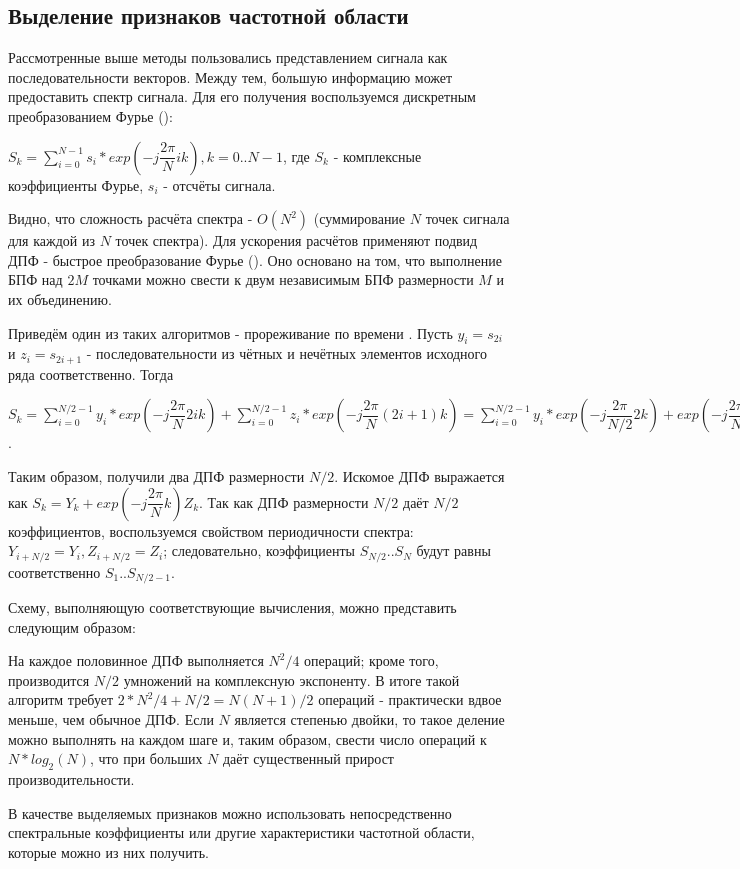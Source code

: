 \subsection{Выделение признаков частотной области}

Рассмотренные выше методы пользовались представлением сигнала как последовательности векторов. Между тем, большую информацию может предоставить спектр сигнала. Для его получения воспользуемся дискретным преобразованием Фурье ():

$S_k=\sum_{i=0}^{N-1}s_i*exp(-j\dfrac{2\pi}{N}ik), k=0..N-1$, где $S_k$ - комплексные коэффициенты Фурье, $s_i$ - отсчёты сигнала.


Видно, что сложность расчёта спектра - $O(N^2)$ (суммирование $N$ точек сигнала для каждой из $N$ точек спектра). Для ускорения расчётов применяют подвид ДПФ - быстрое преобразование Фурье (). Оно основано на том, что выполнение БПФ над $2M$ точками можно свести к двум независимым БПФ размерности $M$ и их объединению. 

Приведём один из таких алгоритмов - прореживание по времени \cite{fft_alg}. Пусть $y_i=s_{2i}$ и $z_i=s_{2i+1}$ - последовательности из чётных и нечётных элементов исходного ряда соответственно. Тогда

$S_k=\sum_{i=0}^{N/2-1}y_i*exp(-j\dfrac{2\pi}{N}2ik)+\sum_{i=0}^{N/2-1}z_i*exp(-j\dfrac{2\pi}{N}(2i+1)k)=\sum_{i=0}^{N/2-1}y_i*exp(-j\dfrac{2\pi}{N/2}2k)+exp(-j\dfrac{2\pi}{N}k)\sum_{i=0}^{N/2-1}z_i*exp(-j\dfrac{2\pi}{N/2}ik)$.

Таким образом, получили два ДПФ размерности $N/2$. Искомое ДПФ выражается как 
$S_k=Y_k+exp(-j\dfrac{2\pi}{N}k)Z_k$. Так как ДПФ размерности $N/2$ даёт $N/2$ коэффициентов, воспользуемся свойством периодичности спектра: $Y_{i+N/2}=Y_i, Z_{i+N/2}=Z_i$; следовательно, коэффициенты $S_{N/2}..S_{N}$ будут равны соответственно $S_{1}..S_{N/2-1}$. 

Схему, выполняющую соответствующие вычисления, можно представить следующим образом:


На каждое половинное ДПФ выполняется $N^2/4$ операций; кроме того, производится $N/2$ умножений на комплексную экспоненту. В итоге такой алгоритм требует $2*N^2/4+N/2=N(N+1)/2$ операций - практически вдвое меньше, чем обычное ДПФ. Если $N$ является степенью двойки, то такое деление можно выполнять на каждом шаге и, таким образом, свести число операций к $N*log_2(N)$, что при больших $N$ даёт существенный прирост производительности.

В качестве выделяемых признаков можно использовать непосредственно спектральные коэффициенты или другие характеристики частотной области, которые можно из них получить.

